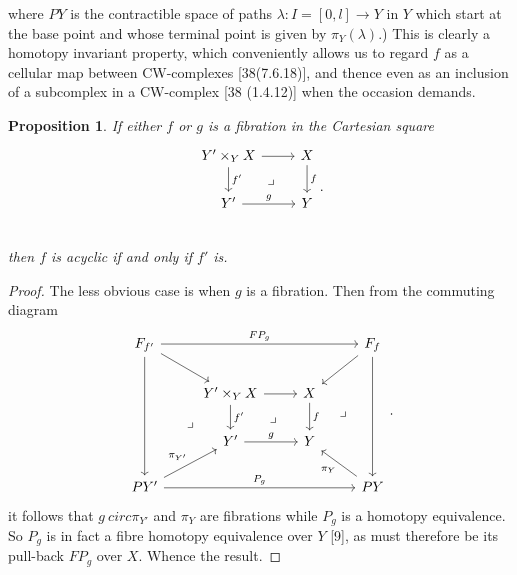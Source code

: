 \documentclass[openany,leqno]{book}  %
\newtheorem{prop}[theorem]{Proposition}
\begin{document}
where $PY$ is the contractible space of paths $\lambda\colon  I = [0,l]\longrightarrow Y$ in $Y$ which start at the base point and whose terminal point is given by $\pi_Y(\lambda)$.) This is clearly a homotopy invariant property, which conveniently allows us to regard $f$ as a cellular map between CW-complexes [38(7.6.18)], and thence even as an inclusion of a subcomplex in a CW-complex [38 (1.4.12)] when the occasion demands.
\begin{prop}
  If either $f$ or $g$ is a fibration in the Cartesian square
\[\begin{tikzcd}
Y'\times_Y X \arrow{r} \arrow{d}{f'} \arrow[dr, phantom, "\lrcorner"]& X\arrow{d}{f}\\
Y' \arrow{r}{g} & Y \\
\end{tikzcd}.\]
then $f$ is acyclic if and only if $f'$ is.
\end{prop}
\begin{proof}
The less obvious case is when $g$ is a fibration. Then from the commuting diagram 
\[\begin{tikzcd}
F_{f'} \arrow{rd} \arrow{rrr}{FP_g} \arrow{ddd}\arrow[ddr, phantom, "\lrcorner",bend right,near end] & & & F_f \arrow{ld} \arrow{ddd}\\
      &Y'\times_Y X \arrow{r} \arrow{d}{f'} \arrow[dr, phantom, "\lrcorner"]& X\arrow{d}{f} \arrow[ddr, phantom, "\lrcorner",bend left,near start]&\\
      &Y' \arrow{r}{g} & Y & \\
PY' \arrow{ur}{\pi_{Y'}} \arrow{rrr}{P_g} & & & PY \arrow{ul}{\pi_Y}
\end{tikzcd}.\]
it follows that $g\ 
circ \pi_{Y'}$ and $\pi_Y$ are fibrations while $P_g$ is a homotopy equivalence. So $P_g$ is in fact a fibre homotopy equivalence over $Y$ [9], as must therefore be its pull-back $FP_g$ over $X$.
Whence the result.
\end{proof}
\end{document}
